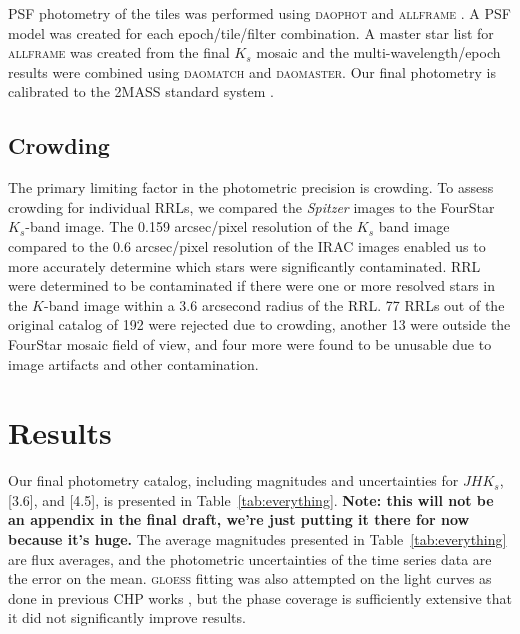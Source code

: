 \documentclass[a4paper,fleqn,usenatbib]{mnras}
\begin{document}
PSF photometry of the tiles was performed using \textsc{daophot} and \textsc{allframe} \citep{1987PASP...99..191S, 1994PASP..106..250S}. A PSF model was created for each epoch/tile/filter combination. A master star list for \textsc{allframe} was created from the final $K_s$ mosaic and the multi-wavelength/epoch results were combined using \textsc{daomatch} and \textsc{daomaster}. Our final photometry is calibrated to the 2MASS standard system \citep{2006AJ....131.1163S}. 

\subsection{Crowding}
\label{sec:crowding}


The primary limiting factor in the photometric precision is crowding. To assess crowding for individual RRLs, we compared the {\it Spitzer} images to the FourStar $K_s$-band image. The 0.159 arcsec/pixel resolution of the $K_s$ band image compared to the 0.6 arcsec/pixel resolution of the IRAC images enabled us to more accurately determine which stars were significantly contaminated. RRL were determined to be contaminated if there were one or more resolved stars in the $K$-band image within a 3.6 arcsecond radius of the RRL. 77 RRLs out of the original catalog of 192 \citep{2004A&A...424.1101K} were rejected due to crowding, another 13 were outside the FourStar mosaic field of view, and four more were found to be unusable due to image artifacts and other contamination. %

\section{Results}
\label{sec:results}

Our final photometry catalog, including magnitudes and uncertainties for $J\!H\!K_s$, [3.6], and [4.5], is presented in Table~\ref{tab:everything}. {\bf Note: this will not be an appendix in the final draft, we're just putting it there for now because it's huge.}
The average magnitudes presented in Table~\ref{tab:everything} are flux averages, and the photometric uncertainties of the time series data are the error on the mean. \textsc{gloess} fitting \citet{2004AJ....128.2239P} was also attempted on the light curves as done in previous CHP works \citep[e.g.][]{2011ApJ...743...76S, 2012ApJ...759..146M, 2014ApJ...794..107R, 2016ApJ...816...49S}, but the phase coverage is sufficiently extensive that it did not significantly improve results.
\end{document}

